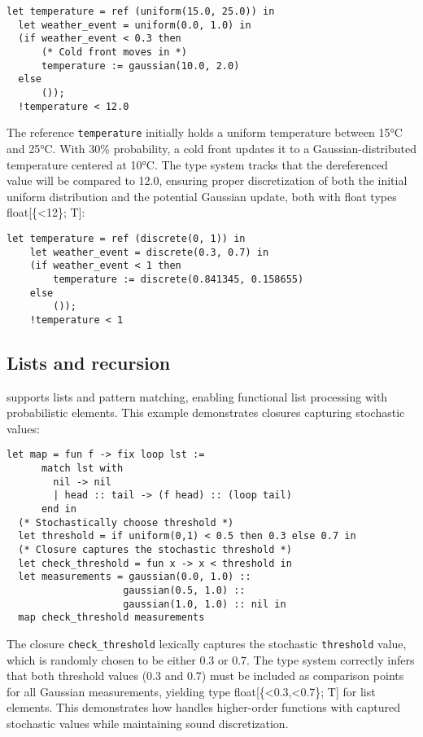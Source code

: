 \documentclass[acmsmall,screen,dvipsnames,x11names,nonacm,anonymous,review]{acmart}
\newcommand{\codetype}[1]{\textcolor{typecolor}{\ttfamily\small#1}}
\newcommand{\ft}[1]{\codetype{float[\{#1\}; T]}}        %
\begin{document}
\begin{lstlisting}[aboveskip=1em,belowskip=1em,escapechar=!]
  let temperature = ref (uniform(15.0, 25.0)) in
  let weather_event = uniform(0.0, 1.0) in
  (if weather_event < 0.3 then
      (* Cold front moves in *)
      temperature := gaussian(10.0, 2.0)
  else
      ());
  !temperature < 12.0
\end{lstlisting}

\noindent The reference \texttt{temperature} initially holds a uniform temperature between 15°C and 25°C. With 30\% probability, a cold front updates it to a Gaussian-distributed temperature centered at 10°C. The type system tracks that the dereferenced value will be compared to 12.0, ensuring proper discretization of both the initial uniform distribution and the potential Gaussian update, both with float types \ft{<12}:

\begin{lstlisting}[aboveskip=1em,belowskip=1em,escapechar=!]
    let temperature = ref (discrete(0, 1)) in
    let weather_event = discrete(0.3, 0.7) in
    (if weather_event < 1 then
        temperature := discrete(0.841345, 0.158655)
    else
        ()); 
    !temperature < 1
\end{lstlisting}

\subsection{Lists and recursion}

\Slice{} supports lists and pattern matching, enabling functional list processing with probabilistic elements. This example demonstrates closures capturing stochastic values:

\begin{lstlisting}[aboveskip=1em,belowskip=1em,escapechar=!]
  let map = fun f -> fix loop lst :=
      match lst with
        nil -> nil
        | head :: tail -> (f head) :: (loop tail)
      end in
  (* Stochastically choose threshold *)
  let threshold = if uniform(0,1) < 0.5 then 0.3 else 0.7 in
  (* Closure captures the stochastic threshold *)
  let check_threshold = fun x -> x < threshold in
  let measurements = gaussian(0.0, 1.0) :: 
                    gaussian(0.5, 1.0) :: 
                    gaussian(1.0, 1.0) :: nil in
  map check_threshold measurements
\end{lstlisting}

\noindent The closure \texttt{check\_threshold} lexically captures the stochastic \texttt{threshold} value, which is randomly chosen to be either 0.3 or 0.7. The type system correctly infers that both threshold values (0.3 and 0.7) must be included as comparison points for all Gaussian measurements, yielding type \ft{<0.3,<0.7} for list elements. This demonstrates how \Slice{} handles higher-order functions with captured stochastic values while maintaining sound discretization.
\end{document}

